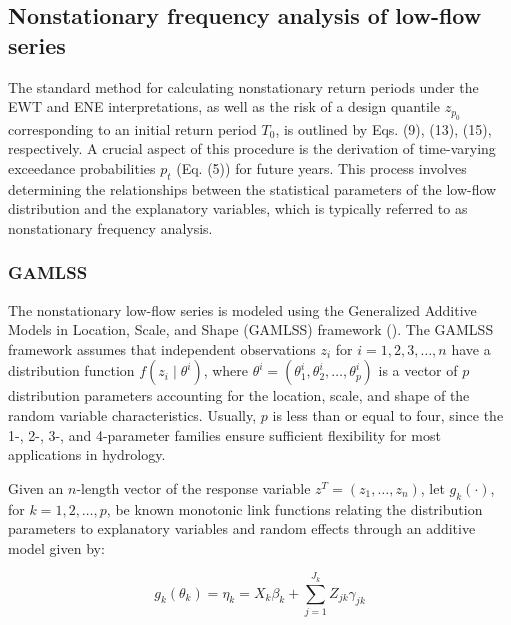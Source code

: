 \documentclass[
]{krantz}
\begin{document}
\subsection{Nonstationary frequency analysis of low-flow series}\label{nonstationary-frequency-analysis-of-low-flow-series}

The standard method for calculating nonstationary return periods under the EWT and ENE interpretations, as well as the risk of a design quantile \(z_{p_{0}}\) corresponding to an initial return period \(T_{0}\), is outlined by Eqs. (9), (13), (15), respectively. A crucial aspect of this procedure is the derivation of time-varying exceedance probabilities \(p_{t}\) (Eq. (5)) for future years. This process involves determining the relationships between the statistical parameters of the low-flow distribution and the explanatory variables, which is typically referred to as nonstationary frequency analysis.

\subsubsection{GAMLSS}\label{gamlss}

The nonstationary low-flow series is modeled using the Generalized Additive Models in Location, Scale, and Shape (GAMLSS) framework (\citet{Rigby2005}). The GAMLSS framework assumes that independent observations \(z_{i}\) for \(i = 1, 2, 3, \ldots, n\) have a distribution function \(f(z_{i} \mid \theta^{i})\), where \(\theta^{i} = (\theta_{1}^{i}, \theta_{2}^{i}, \ldots, \theta_{p}^{i})\) is a vector of \(p\) distribution parameters accounting for the location, scale, and shape of the random variable characteristics. Usually, \(p\) is less than or equal to four, since the 1-, 2-, 3-, and 4-parameter families ensure sufficient flexibility for most applications in hydrology.

Given an \(n\)-length vector of the response variable \(z^{T} = (z_{1}, \ldots, z_{n})\), let \(g_{k}(\cdot)\), for \(k = 1, 2, \ldots, p\), be known monotonic link functions relating the distribution parameters to explanatory variables and random effects through an additive model given by:

\[
g_{k}(\theta_{k}) = \eta_{k} = X_{k} \beta_{k} + \sum_{j=1}^{J_{k}} Z_{jk} \gamma_{jk}\tag{16}
\]
\end{document}

